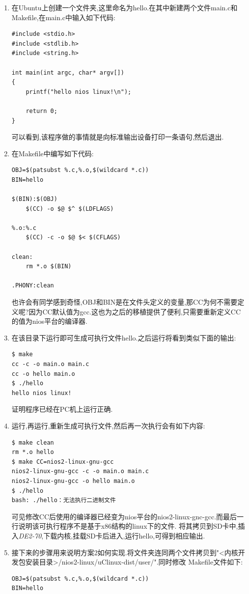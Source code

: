 \documentclass[12pt,a4paper,titlepage]{article}
\begin{document}
\begin{enumerate}
\item 在Ubuntu上创建一个文件夹,这里命名为hello.在其中新建两个文件main.c和Makefile,在main.c中输入如下代码:
\begin{verbatim}
#include <stdio.h>
#include <stdlib.h>
#include <string.h>

int main(int argc, char* argv[])
{
    printf("hello nios linux!\n");

    return 0;
}
\end{verbatim}
可以看到,该程序做的事情就是向标准输出设备打印一条语句,然后退出.
\item 在Makefile中编写如下代码:
\begin{verbatim}
OBJ=$(patsubst %.c,%.o,$(wildcard *.c))
BIN=hello

$(BIN):$(OBJ)
    $(CC) -o $@ $^ $(LDFLAGS)

%.o:%.c
    $(CC) -c -o $@ $< $(CFLAGS)

clean:
    rm *.o $(BIN)

.PHONY:clean
\end{verbatim}
也许会有同学感到奇怪,OBJ和BIN是在文件头定义的变量,那CC为何不需要定义呢?因为CC默认值为gcc.这也为之后的移植提供了便利,只需要重新定义CC
的值为nios平台的编译器.
\item 在该目录下运行即可生成可执行文件hello.之后运行将看到类似下面的输出:
\begin{verbatim}
$ make
cc -c -o main.o main.c 
cc -o hello main.o 
$ ./hello 
hello nios linux!
\end{verbatim}
证明程序已经在PC机上运行正确.
\item 运行,再运行,重新生成可执行文件,然后再一次执行会有如下内容:
\begin{verbatim}
$ make clean
rm *.o hello
$ make CC=nios2-linux-gnu-gcc
nios2-linux-gnu-gcc -c -o main.o main.c 
nios2-linux-gnu-gcc -o hello main.o 
$ ./hello 
bash: ./hello：无法执行二进制文件
\end{verbatim}
可见修改CC后使用的编译器已经变为nios平台的nios2-linux-gnc-gcc.而最后一行说明该可执行程序不是基于x86结构的linux下的文件.
将其拷贝到SD卡中,插入\textit{DE2-70},下载内核,挂载SD卡后进入,运行hello,可得到相应输出.
\item 接下来的步骤用来说明方案2如何实现.将文件夹连同两个文件拷贝到"<内核开发包安装目录>/nios2-linux/uClinux-dist/user/".同时修改
Makefile文件如下:
\begin{verbatim}
OBJ=$(patsubst %.c,%.o,$(wildcard *.c))
BIN=hello


\end{verbatim}
\end{enumerate}
\end{document}
